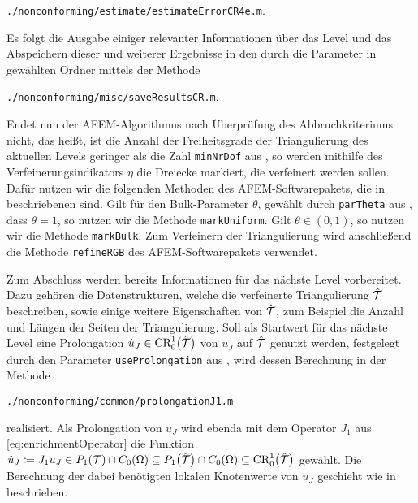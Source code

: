 \begin{center}
  \texttt{./nonconforming/estimate/estimateErrorCR4e.m}.
\end{center}
Es folgt die Ausgabe einiger relevanter Informationen über das Level und das
Abspeichern dieser und weiterer Ergebnisse in den durch die Parameter in
 gewählten Ordner mittels der Methode
\begin{center}
  \texttt{./nonconforming/misc/saveResultsCR.m}.
\end{center}
Endet nun der AFEM-Algorithmus nach Überprüfung des Abbruchkriteriums nicht,
das heißt, ist die Anzahl der Freiheitsgrade der Triangulierung des aktuellen
Levels geringer als die Zahl \texttt{minNrDof} aus , so
werden mithilfe des Verfeinerungsindikators $\eta$ die Dreiecke markiert, die
verfeinert werden sollen. 
Dafür nutzen wir die folgenden Methoden des AFEM-Softwarepakets, die in
\cite[Abschnitt 1.6]{CGKNRR10} beschriebenen sind.
Gilt für den Bulk-Parameter $\theta$, gewählt durch \texttt{parTheta} aus
, dass $\theta=1$, so nutzen
wir die Methode \texttt{markUniform}. Gilt $\theta\in(0,1)$, so nutzen wir
die Methode \texttt{markBulk}.
Zum Verfeinern der Triangulierung wird anschließend die Methode
\texttt{refineRGB} \cite[1.7.2]{CGKNRR10} des AFEM-Softwarepakets verwendet.

Zum Abschluss werden bereits Informationen für das nächste Level vorbereitet. 
Dazu gehören die Datenstrukturen, welche die verfeinerte Triangulierung
$\hat{\mathcal{T}}$ beschreiben, sowie einige weitere Eigenschaften von
$\hat{\mathcal{T}}$, zum Beispiel die Anzahl und Längen der Seiten der Triangulierung.
Soll als Startwert für das nächste Level eine Prolongation $\hat
u_J\in\textup{CR}^1_0\big(\hat{\mathcal{T}}\big)$ von $u_J$ auf $\hat{\mathcal{T}}$ genutzt werden,
festgelegt durch den Parameter \texttt{useProlongation} aus
, wird dessen Berechnung in der Methode
\begin{center}
  \texttt{./nonconforming/common/prolongationJ1.m}
\end{center}
realisiert. 
Als Prolongation von $u_J$ wird ebenda mit dem Operator $J_1$ aus
\eqref{eq:enrichmentOperator} die Funktion $\hat u_J\coloneqq J_1 u_J\in
P_1(\mathcal{T})\cap C_0(\Omega)\subseteq P_1\big(\hat{\mathcal{T}}\big)\cap C_0(\Omega)
\subseteq \textup{CR}^1_0\big(\hat{\mathcal{T}}\big)$ gewählt.
Die Berechnung der dabei benötigten lokalen Knotenwerte von $u_J$ geschieht
wie in  beschrieben.

